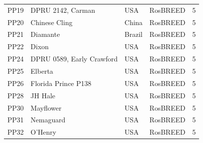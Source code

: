 \documentclass[12pt]{article}
\begin{document}
\begin{center}
\begin{longtable}{lllll}
                 PP19 &DPRU 2142, Carman &USA &RosBREED &5\\
                 PP20 &Chinese Cling&China &RosBREED &5\\
                 PP21 &Diamante&Brazil &RosBREED &5\\
                 PP22 &Dixon&USA &RosBREED &5\\
                 PP24 &DPRU 0589, Early Crawford &USA &RosBREED &5\\
                 PP25 &Elberta&USA &RosBREED &5\\
                 PP26 &Florida Prince P138&USA &RosBREED &5\\
                 PP28 &JH Hale&USA &RosBREED &5\\
                 PP30 &Mayflower&USA &RosBREED &5\\
                 PP31 &Nemaguard &USA &RosBREED &5\\
                 PP32 &O'Henry &USA &RosBREED &5\\

\end{longtable}
\end{center}
\end{document}
